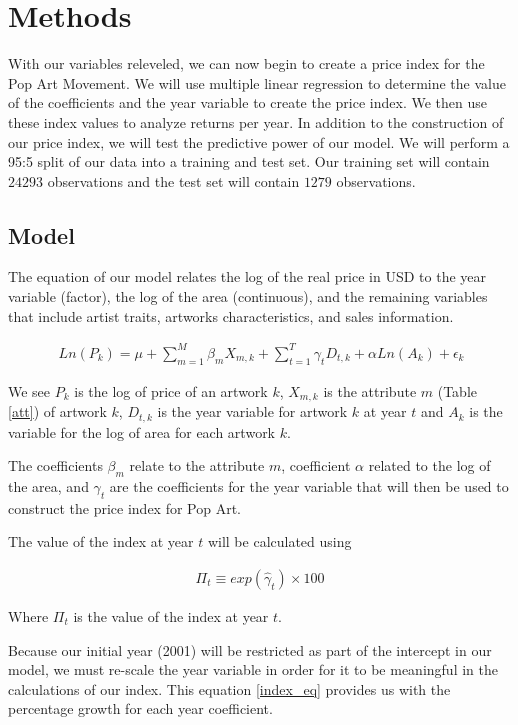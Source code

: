 \documentclass[]{asaproc}\usepackage[]{graphicx}\usepackage[]{color}
\begin{document}
\section{Methods}

With our variables releveled, we can now begin to create a price index for the Pop Art Movement. We will use multiple linear regression to determine the value of the coefficients and the year variable to create the price index. We then use these index values to analyze returns per year. 
In addition to the construction of our price index, we will test the predictive power of our model. We will perform a 95:5 split of our data into a training and test set. Our training set will contain $24293$ observations and the test set will contain $1279$ observations.

\subsection{Model}

The equation of our model relates the log of the real price in USD to the year variable (factor), the log of the area (continuous), and the remaining variables that include artist traits, artworks characteristics, and sales information.

\footnotesize
\begin{align}
\ Ln(P_{k}) = \mu + \sum_{m=1}^M \beta_m X_{m,k} + \sum_{t=1}^T\gamma_t D_{t,k} + \alpha Ln(A_k) + \epsilon_{k} 
\label{model}
\end{align}
\normalsize

We see $P_{k}$ is the log of price of an artwork $k$, $X_{m,k}$ is the attribute $m$ (Table \ref{att}) of artwork $k$, $D_{t,k}$ is the year variable for artwork $k$ at year $t$ and $A_k$ is the variable for the log of area for each artwork $k$.

The coefficients $\beta_m$ relate to the attribute $m$, coefficient $\alpha$ related to the log of the area, and $\gamma_t$ are the coefficients for the year variable that will then be used to construct the price index for Pop Art.

The value of the index at year $t$ will be calculated using

\begin{align}
\Pi_t \equiv exp(\hat\gamma_t) \times 100 
\label{index_eq}
\end{align}

Where $\Pi_t$ is the value of the index at year $t$.

Because our initial year (2001) will be restricted as part of the intercept in our model, we must re-scale the year variable in order for it to be meaningful in the calculations of our index. This equation \ref{index_eq} provides us with the percentage growth for each year coefficient.
\end{document}
